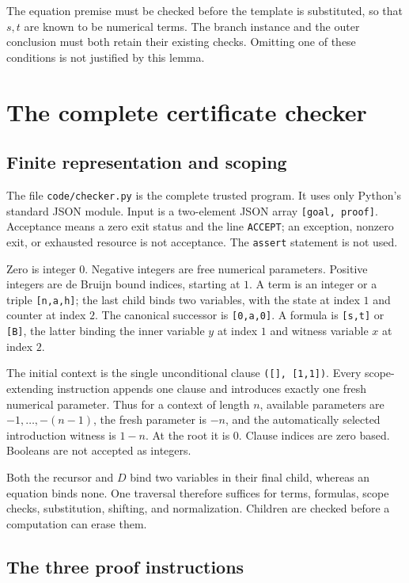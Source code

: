 \documentclass[11pt]{article}
\theoremstyle{definition}\newtheorem{definition}[theorem]{Definition}
\theoremstyle{remark}\newtheorem{remark}[theorem]{Remark}
\newcommand{\file}[1]{\texttt{\small\nolinkurl{#1}}}
\begin{document}
The equation premise must be checked before the template is substituted,
so that $s,t$ are known to be numerical terms.  The branch instance and
the outer conclusion must both retain their existing checks.  Omitting
one of these conditions is not justified by this lemma.

\section{The complete certificate checker}
\label{sec:implementation}

\subsection{Finite representation and scoping}

The file \file{code/checker.py} is the complete trusted program. It uses
only Python's standard JSON module. Input is a two-element JSON array
\texttt{[goal, proof]}. Acceptance means a zero exit status and the line
\texttt{ACCEPT}; an exception, nonzero exit, or exhausted resource is not
acceptance. The \texttt{assert} statement is not used.

Zero is integer $0$. Negative integers are free numerical parameters.
Positive integers are de Bruijn bound indices, starting at $1$. A term
is an integer or a triple \texttt{[n,a,h]}; the last child binds two
variables, with the state at index $1$ and counter at index $2$.
The canonical successor is \texttt{[0,a,0]}. A formula is
\texttt{[s,t]} or \texttt{[B]}, the latter binding the inner variable
$y$ at index $1$ and witness variable $x$ at index $2$.

The initial context is the single unconditional clause
\texttt{([], [1,1])}. Every scope-extending instruction appends one
clause and introduces exactly one fresh numerical parameter. Thus for
a context of length $n$, available parameters are
$-1,\ldots,-(n-1)$, the fresh parameter is $-n$, and the automatically
selected introduction witness is $1-n$. At the root it is $0$.
Clause indices are zero based. Booleans are not accepted as integers.

Both the recursor and $D$ bind two variables in their final child, whereas
an equation binds none. One traversal therefore suffices for terms,
formulas, scope checks, substitution, shifting, and normalization.
Children are checked before a computation can erase them.

\subsection{The three proof instructions}
\end{document}
